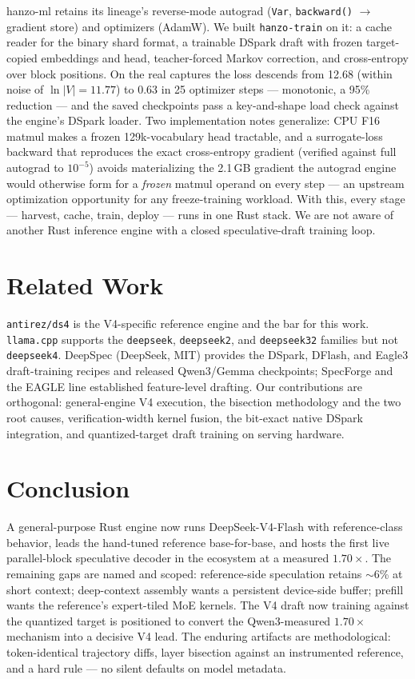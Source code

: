 \documentclass[11pt]{article}
\begin{document}
hanzo-ml retains its lineage's reverse-mode autograd
(\texttt{Var}, \texttt{backward()} $\rightarrow$ gradient store) and
optimizers (AdamW). We built \texttt{hanzo-train} on it: a cache reader
for the binary shard format, a trainable DSpark draft with frozen
target-copied embeddings and head, teacher-forced Markov correction, and
cross-entropy over block positions. On the real captures the loss
descends from 12.68 (within noise of $\ln|V| = 11.77$) to 0.63 in 25
optimizer steps --- monotonic, a 95\% reduction --- and the saved
checkpoints pass a key-and-shape load check against the engine's DSpark
loader. Two implementation notes generalize: CPU F16 matmul makes a
frozen 129k-vocabulary head tractable, and a surrogate-loss backward
that reproduces the exact cross-entropy gradient (verified against full
autograd to $10^{-5}$) avoids materializing the 2.1\,GB gradient the
autograd engine would otherwise form for a \emph{frozen} matmul operand
on every step --- an upstream optimization opportunity for any
freeze-training workload. With this, every stage --- harvest, cache,
train, deploy --- runs in one Rust stack. We are not aware of another
Rust inference engine with a closed speculative-draft training loop.

\section{Related Work}

\texttt{antirez/ds4} is the V4-specific reference engine and the bar for
this work. \texttt{llama.cpp} supports the \texttt{deepseek},
\texttt{deepseek2}, and \texttt{deepseek32} families but not
\texttt{deepseek4}. DeepSpec (DeepSeek, MIT) provides the DSpark, DFlash,
and Eagle3 draft-training recipes and released Qwen3/Gemma checkpoints;
SpecForge and the EAGLE line established feature-level drafting. Our
contributions are orthogonal: general-engine V4 execution, the bisection
methodology and the two root causes, verification-width kernel fusion,
the bit-exact native DSpark integration, and quantized-target draft
training on serving hardware.

\section{Conclusion}

A general-purpose Rust engine now runs DeepSeek-V4-Flash with
reference-class behavior, leads the hand-tuned reference base-for-base,
and hosts the first live parallel-block speculative decoder in the
ecosystem at a measured $1.70\times$. The remaining gaps are named and
scoped: reference-side speculation retains $\sim$6\% at short context;
deep-context assembly wants a persistent device-side buffer; prefill
wants the reference's expert-tiled MoE kernels. The V4 draft now training
against the quantized target is positioned to convert the Qwen3-measured
$1.70\times$ mechanism into a decisive V4 lead. The enduring artifacts
are methodological: token-identical trajectory diffs, layer bisection
against an instrumented reference, and a hard rule --- no silent defaults
on model metadata.
\end{document}
